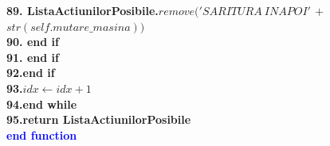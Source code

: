 \documentclass{article}
\begin{document}
\begin{center}
\begin{tabbing}
\bfseries{89.}\indent          \> \> \> \>\textbf{ListaActiunilorPosibile}.$remove('SARITURA\ INAPOI'$ $+$ $str(self.mutare\_masina))$\\
\bfseries{90.}\indent          \> \>  \>\textbf{end if}\\
\bfseries{91.}\indent\>        \>\textbf{end if}\\
\bfseries{92.}\indent\>\textbf{end if }\\
\bfseries{93.}\indent\>$idx \leftarrow idx + 1$ \\
\bfseries{94.}\indent\>\textbf{end while }\\
\bfseries{95.}\indent\>\textbf{return ListaActiunilorPosibile }\\
\indent\textbf{\textcolor{blue}{end }}\=\textbf{\textcolor{blue}{function}}
\end{tabbing}
\end{center}
\end{document}
